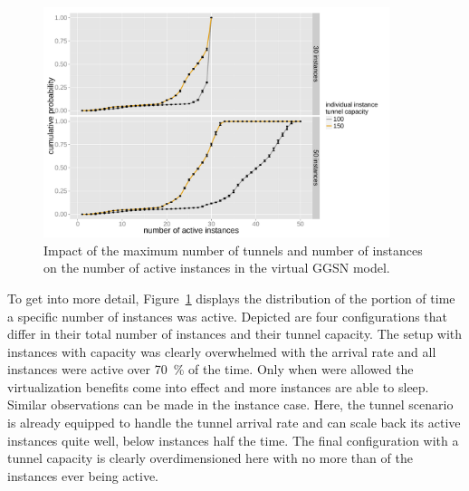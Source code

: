 \begin{figure}[htb]
	\centering
	\includegraphics[width=0.9\textwidth]{images/R-virtualized-instanceuse.pdf}
	\caption{Impact of the maximum number of tunnels and number of instances on the number of active instances in the virtual \gls{GGSN} model.}
\label{c4:fig:virtualized_instanceuse}
\end{figure}

To get into more detail, Figure~\ref{c4:fig:virtualized_instanceuse} displays the distribution of the portion of time a specific number of instances was active. Depicted are four configurations that differ in their total number of instances and their tunnel capacity. The setup with  instances with  capacity was clearly overwhelmed with the arrival rate and all  instances were active over \SI{70}{\percent} of the time. Only when  were allowed the virtualization benefits come into effect and more instances are able to sleep. Similar observations can be made in the  instance case.  Here, the  tunnel scenario is already equipped to handle the tunnel arrival rate and can scale back its active instances quite well, below  instances half the time. The final configuration with a  tunnel capacity is clearly overdimensioned here with no more than  of the  instances ever being active.

